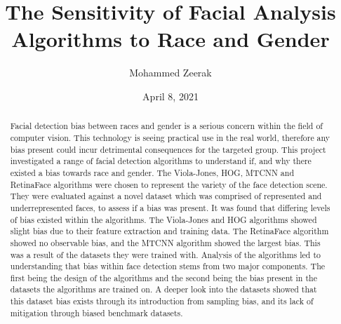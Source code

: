\documentclass{l4proj}
\begin{document}
\title{The Sensitivity of Facial Analysis Algorithms to Race and Gender}
\author{Mohammed Zeerak}
\date{April 8, 2021}

\maketitle

\begin{abstract}
    
    Facial detection bias between races and gender is a serious concern within the field of computer vision. This technology is seeing practical use in the real world, therefore any bias present could incur detrimental consequences for the targeted group. This project investigated a range of facial detection algorithms to understand if, and why there existed a bias towards race and gender. The Viola-Jones, HOG, MTCNN and RetinaFace algorithms were chosen to represent the variety of the face detection scene. They were evaluated against a novel dataset which was comprised of represented and underrepresented faces, to assess if a bias was present. It was found that differing levels of bias existed within the algorithms. The Viola-Jones and HOG algorithms showed slight bias due to their feature extraction and training data. The RetinaFace algorithm showed no observable bias, and the MTCNN algorithm showed the largest bias. This was a result of the datasets they were trained with. Analysis of the algorithms led to understanding that bias within face detection stems from two major components. The first being the design of the algorithms and the second being the bias present in the datasets the algorithms are trained on. A deeper look into the datasets showed that this dataset bias exists through its introduction from sampling bias, and its lack of mitigation through biased benchmark datasets.
    
\end{abstract}
\end{document}
